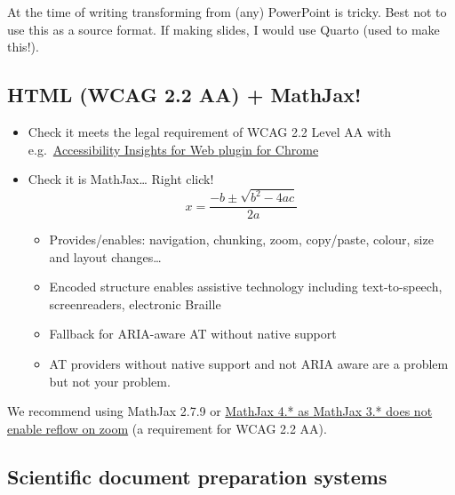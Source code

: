 \documentclass[
  12pt,
  a4-paperpaper,
  DIV=11,
  numbers=noendperiod]{scrartcl}
\providecommand{\tightlist}{%
  \setlength{\itemsep}{0pt}\setlength{\parskip}{0pt}}
\begin{document}
At the time of writing transforming from (any) PowerPoint is tricky.
Best not to use this as a source format. If making slides, I would use
Quarto (used to make this!).

\subsection{HTML (WCAG 2.2 AA) +
MathJax!}\label{html-wcag-2.2-aa-mathjax}

\begin{itemize}
\item
  Check it meets the legal requirement of WCAG 2.2 Level AA with
  e.g.~\href{https://accessibilityinsights.io/docs/en/web/overview}{Accessibility
  Insights for Web plugin for Chrome}
\item
  Check it is MathJax\ldots{} Right click!
  \[x = \frac{-b\pm\sqrt{b^2 - 4ac}}{2a}\]

  \begin{itemize}
  \tightlist
  \item
    Provides/enables: navigation, chunking, zoom, copy/paste, colour,
    size and layout changes\ldots{}
  \item
    Encoded structure enables assistive technology including
    text-to-speech, screenreaders, electronic Braille
  \item
    Fallback for ARIA-aware AT without native support
  \item
    AT providers without native support and not ARIA aware are a problem
    but not your problem.
  \end{itemize}
\end{itemize}

We recommend using MathJax 2.7.9 or
\href{https://docs.mathjax.org/en/v4.0/output/linebreaks.html}{MathJax
4.* as MathJax 3.* does not enable reflow on zoom} (a requirement for
WCAG 2.2 AA).

\subsection{Scientific document preparation
systems}\label{scientific-document-preparation-systems}
\end{document}

